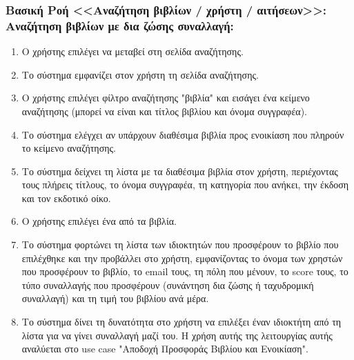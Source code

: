 \documentclass[12pt,a4paper]{article}
\begin{document}
\subsubsection*{Βασική Ροή <<Αναζήτηση βιβλίων / χρήστη / αιτήσεων>>: Αναζήτηση βιβλίων με δια ζώσης συναλλαγή:}
\begin{enumerate}
    \item Ο χρήστης επιλέγει να μεταβεί στη σελίδα αναζήτησης.
    \item Το σύστημα εμφανίζει στον χρήστη τη σελίδα αναζήτησης.
    \item Ο χρήστης επιλέγει φίλτρο αναζήτησης "βιβλία" και εισάγει ένα κείμενο αναζήτησης (μπορεί να είναι και τίτλος βιβλίου και όνομα συγγραφέα).
        \label{Επιλογή τύπου αναζήτησης}
    \item Το σύστημα ελέγχει αν υπάρχουν διαθέσιμα βιβλία προς ενοικίαση που πληρούν το κείμενο αναζήτησης.
        \label{Ύπαρξη βιβλίου}
    \item Το σύστημα δείχνει τη λίστα με τα διαθέσιμα βιβλία στον χρήστη, περιέχοντας τους πλήρεις τίτλους, το όνομα συγγραφέα, τη κατηγορία που ανήκει, την έκδοση και τον εκδοτικό οίκο.
    \item Ο χρήστης επιλέγει ένα από τα βιβλία.
    \item Το σύστημα φορτώνει τη λίστα των ιδιοκτητών που προσφέρουν το βιβλίο που επιλέχθηκε και την προβάλλει στο χρήστη, εμφανίζοντας το όνομα των χρηστών που προσφέρουν το βιβλίο, το email τους, τη πόλη που μένουν, το score τους, το τύπο συναλλαγής που προσφέρουν (συνάντηση δια ζώσης ή ταχυδρομική συναλλαγή) και τη τιμή του βιβλίου ανά μέρα. 
    \item Το σύστημα δίνει τη δυνατότητα στο χρήστη να επιλέξει έναν ιδιοκτήτη από τη λίστα για να γίνει συναλλαγή μαζί του. Η χρήση αυτής της λειτουργίας αυτής αναλύεται στο use case "Αποδοχή Προσφοράς Βιβλίου και Ενοικίαση".
\end{enumerate}
\end{document}

